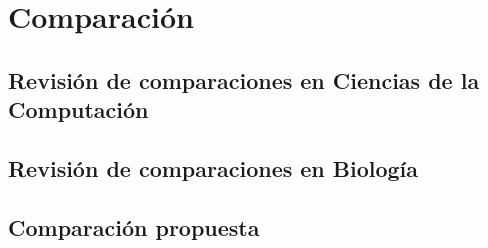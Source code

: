 \chapter{Comparación}
\label{ch:results}

\section{Revisión de comparaciones en Ciencias de la Computación}




\section{Revisión de comparaciones en Biología}


\section{Comparación propuesta}